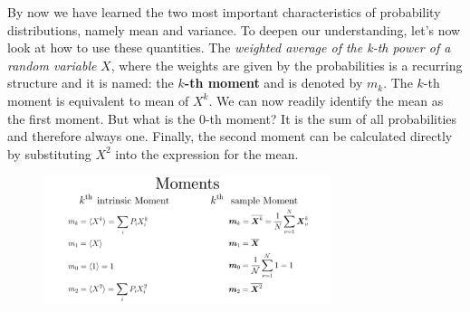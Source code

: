 \documentclass[12pt, a4paper]{scrartcl}
\begin{document}
By now we have learned the two most important characteristics of probability distributions, namely mean and variance.
To deepen our understanding, let's now look at how to use these quantities.
The \textit{weighted average of the k-th power of a random variable }$X$, where the weights are given by the probabilities is a recurring structure and it is named: the \textbf{$k$-th moment} and is denoted by $m_k$.
The $k$-th moment is equivalent to mean of $X^k$.
We can now readily identify the mean as the first moment. 
But what is the 0-th moment? It is the sum of all probabilities and therefore always one.
Finally, the second moment can be calculated directly by substituting $X^2$ into the expression for the mean.\\
\begin{figure}[H]
	\centering
	\includegraphics[width=0.75\textwidth]{2_8.png}
\end{figure}

\\
\end{document}
